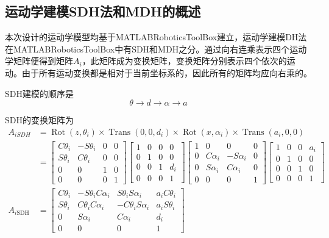 \documentclass[UTF8]{article}%
\newcommand{\n}{\par}%
\begin{document}
\begin{spacing}{1.5}
	\subsection{运动学建模SDH法和MDH的概述}
	本次设计的运动学模型均基于MATLABRoboticsToolBox建立，运动学建模DH法在MATLABRoboticsToolBox中有SDH和MDH之分。通过向右连乘表示四个运动学矩阵便得到矩阵$A_i$，此矩阵成为变换矩阵，变换矩阵分别表示四个依次的运动。由于所有运动变换都是相对于当前坐标系的，因此所有的矩阵均应向右乘的。\n
	SDH建模的顺序是$$\theta\rightarrow d\rightarrow\alpha\rightarrow a$$\n
	SDH的变换矩阵为\\
	$\begin{aligned}
		A_{iSDH}&=\operatorname{Rot}\left(z,\theta_{i}\right)\times\operatorname{Trans}\left(0,0,d_{i}\right)\times\operatorname{Rot}\left(x,\alpha_{i}\right)\times\operatorname{Trans}\left(a_{i},0,0\right)\\
		&=\left[\begin{array}{cccc}
			C\theta_i&-S\theta_i&0&0\\
			S\theta_i&C\theta_i&0&0\\
			0&0&1&0\\
			0&0&0&1\end{array}\right]
		\left[\begin{array}{cccc}
			1&0&0&0\\
			0&1&0&0\\
			0&0&1&d_i\\
			0&0&0&1\end{array}\right]
		\left[\begin{array}{cccc}
			1&0&0&0\\
			0&C\alpha_i&-S\alpha_i&0\\
			0&S\alpha_i&C\alpha_i&0\\
			0&0&0&1\end{array}\right]
		\left[\begin{array}{cccc}
			1&0&0&a_i\\
			0&1&0&0\\
			0&0&1&0\\
			0&0&0&1\end{array}\right]\\
		A_{i\mathrm{SDH}}&=\left[\begin{array}{cccc}
			C\theta_i&-S\theta_iC\alpha_i&S\theta_iS\alpha_i&a_iC\theta_i\\
			S\theta_i&C\theta_iC\alpha_i&-C\theta_iS\alpha_i&a_iS\theta_i\\
			0&S\alpha_i&C\alpha_i&d_i\\
			0&0&0&1\end{array}\right]\end{aligned}$\\\n

\end{spacing}
\end{document}
